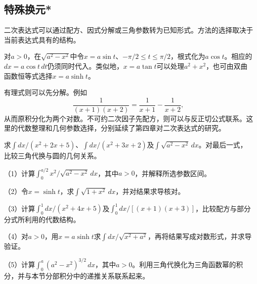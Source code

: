 \endgroup
\newpage
\subsection{特殊换元*}

二次表达式可以通过配方、因式分解或三角参数转为已知形式。方法的选择取决于当前表达式具有的结构。

对\(a>0\)，在\(\sqrt{a^2-x^2}\)中令\(x=a\sin t\)、\(-\pi/2\le t\le\pi/2\)，根式化为\(a\cos t\)。相应的\(dx=a\cos t\,dt\)仍须同时代入。类似地，\(x=a\tan t\)可以处理\(a^2+x^2\)，也可由双曲函数恒等式选择\(x=a\sinh t\)。

有理式则可以先分解。例如
\begin{equation*}
 \frac1{(x+1)(x+2)}=\frac1{x+1}-\frac1{x+2},
\end{equation*}
从而原积分化为两个对数。不可约二次因子先配方，则可以与反正切公式联系。这里的代数整理和几何参数选择，分别延续了第四章对二次表达式的研究。

\begin{example}
求\(\int dx/(x^2+2x+5)\)、\(\int dx/(x^2+3x+2)\)及\(\int\sqrt{a^2-x^2}\,dx\)。对最后一式，比较三角代换与圆的几何关系。
\end{example}

\begin{exercise}
\mbox{}\par\nobreak

（1）计算\(\int_0^{a/2} x^2/\sqrt{a^2-x^2}\,dx\)，其中\(a>0\)，并解释所选参数区间。

（2）令\(x=\sinh t\)，求\(\int\sqrt{1+x^2}\,dx\)，并对结果求导核对。

（3）计算\(\int_0^1dx/(x^2+4x+5)\)及\(\int_0^1dx/[(x+1)(x+3)]\)，比较配方与部分分式所利用的代数结构。

（4）对\(a>0\)，用\(x=a\sinh t\)求\(\int dx/\sqrt{x^2+a^2}\)，再将结果写成对数形式，并求导验证。

（5）计算\(\int_0^a(a^2-x^2)^{3/2}\,dx\)，其中\(a>0\)。利用三角代换化为三角函数幂的积分，并与本节分部积分中的递推关系联系起来。
\end{exercise}
